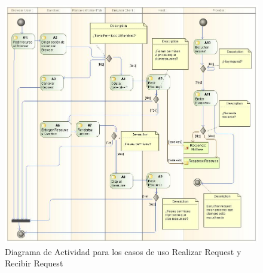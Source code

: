 \begin{figure}[h]
    \centering
    \includegraphics[scale=0.45]{figures/chap5/activityDiag.jpg}
    \caption{Diagrama de Actividad para los casos de uso Realizar Request y Recibir Request}
    \label{fig:ActDiagr}
\end{figure}

